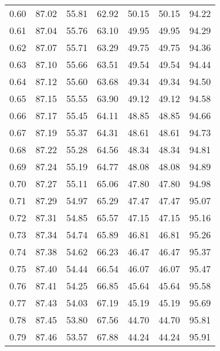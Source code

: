 \begin{tabular}{|c|c|c|c|c|c|c|}
      0.60 &     87.02 &     55.81 &      62.92 &   50.15 &      50.15 &         94.22 \\
      0.61 &     87.04 &     55.76 &      63.10 &   49.95 &      49.95 &         94.29 \\
      0.62 &     87.07 &     55.71 &      63.29 &   49.75 &      49.75 &         94.36 \\
      0.63 &     87.10 &     55.66 &      63.51 &   49.54 &      49.54 &         94.44 \\
      0.64 &     87.12 &     55.60 &      63.68 &   49.34 &      49.34 &         94.50 \\
      0.65 &     87.15 &     55.55 &      63.90 &   49.12 &      49.12 &         94.58 \\
      0.66 &     87.17 &     55.45 &      64.11 &   48.85 &      48.85 &         94.66 \\
      0.67 &     87.19 &     55.37 &      64.31 &   48.61 &      48.61 &         94.73 \\
      0.68 &     87.22 &     55.28 &      64.56 &   48.34 &      48.34 &         94.81 \\
      0.69 &     87.24 &     55.19 &      64.77 &   48.08 &      48.08 &         94.89 \\
      0.70 &     87.27 &     55.11 &      65.06 &   47.80 &      47.80 &         94.98 \\
      0.71 &     87.29 &     54.97 &      65.29 &   47.47 &      47.47 &         95.07 \\
      0.72 &     87.31 &     54.85 &      65.57 &   47.15 &      47.15 &         95.16 \\
      0.73 &     87.34 &     54.74 &      65.89 &   46.81 &      46.81 &         95.26 \\
      0.74 &     87.38 &     54.62 &      66.23 &   46.47 &      46.47 &         95.37 \\
      0.75 &     87.40 &     54.44 &      66.54 &   46.07 &      46.07 &         95.47 \\
      0.76 &     87.41 &     54.25 &      66.85 &   45.64 &      45.64 &         95.58 \\
      0.77 &     87.43 &     54.03 &      67.19 &   45.19 &      45.19 &         95.69 \\
      0.78 &     87.45 &     53.80 &      67.56 &   44.70 &      44.70 &         95.81 \\
      0.79 &     87.46 &     53.57 &      67.88 &   44.24 &      44.24 &         95.91 \\

\end{tabular}
